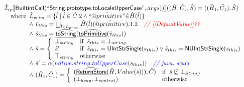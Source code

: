 \documentclass{article}
\makeatletter
\newcommand{\SF}[1]{\mbox{\textsf{#1}}}
\newcommand{\comment}[1]{\textit{#1}}
\newcommand{\wherec}[1]{{\rm where}\begin{array}[t]{l}#1\end{array}}
\newcommand{\ifc}[1]{{\rm if}\begin{array}[t]{l}#1\end{array}}
\newcommand{\owc}{{\rm otherwise}}
\newcommand{\aI}{\hat{\mathcal{I}}}
\newcommand{\lbr}{\llbracket}
\newcommand{\rbr}{\rrbracket}
\newcommand{\ahf}[1]{\widehat{\underline{\sf #1}}}
\newcommand{\avarprop}[1]{\hat{@#1}}
\def\inred{\color{red}}
\def\inblue{\color{blue}}
\def\inred{\color{red}}
\def\inblue{\color{blue}}
\makeatother
\begin{document}
\[\begin{array}{l}
\aI _{cp}\lbr \SF{BuiltintCall}(``\SF{String.prototype.toLocaleUpperCase}",args))\rbr((\hat{H},\hat{C}), \hat{S})
  = ((\hat{H}_1, \hat{C_1}), \hat{S})\\
\quad\wherec{ 
  \hat{L}_{prim} = \{ \hat{l} \mid \hat{l} \in \hat{C}.2 \land ``\avarprop{primitive}" \dot{\in}\hat{H}(\hat{l}) \}\\
  \land\ \hat{v}_{this} = \bigsqcup_{\hat{l} \in \hat{L}_{prim}} \hat{H}(\hat{l})(\avarprop{primitive}).1.2
    \quad\comment{{\inred // [[DefaultValue]]??}}\\
  \land\ \hat{s}_{this} = \ahf{toString}(\ahf{toPrimitive}(\hat{v}_{this}))\\
  \land\ \hat{s} = \left\{\begin{array}{ll}
      \bot_{string} & \ifc{\hat{s}_{this} = \bot_{string}}\\
      \hat{s}' & \ifc{\hat{s}_{this} = \SF{UIntStrSingle}(s_{this}) \lor \hat{s}_{this} = \SF{NUIntStrSingle}(s_{this}) }\\
      \top_{string} & \owc
    \end{array}\right.\\
  \land\ \hat{s}' = \alpha({\inblue native.string.toUpperCase}(s_{this}))
    \quad\comment{{\inblue // java, scala}}\\  
  \land\ (\hat{H}_1, \hat{C}_1) = 
    \left\{\begin{array}{ll}
      (\ahf{ReturnStore}(\hat{H}, Value(\hat{s}))), \hat{C})
      & \ifc{\hat{s} \not\sqsubseteq \bot_{String}}\\
      (\bot_{heap}, \bot_{context}) & \owc \\
    \end{array}\right.\\
  }\\
\\\\



\end{array}\]
\end{document}
